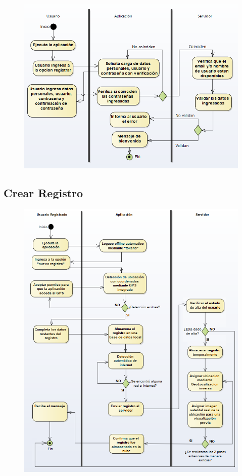 	\begin{figure}[H]
	\centering
		\includegraphics[width=1\textwidth]{imagenes/analisis/diagrama-actividad-registrar.png}
		\label{fig:diagrama-actividad-registrar}
	\end{figure}

	\subsection{Crear Registro }

	\begin{figure}[H]
	\centering
		\includegraphics{imagenes/analisis/diagrama-actividad-crear-registro.png}
		\label{fig:diagrama-actividad-crear-tienda}
	\end{figure}

